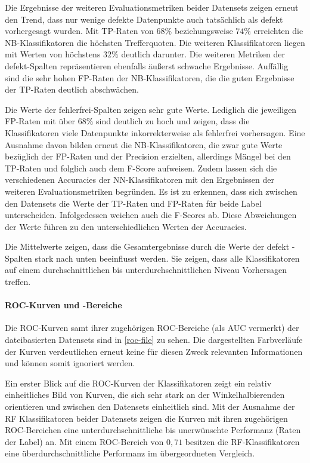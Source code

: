 Die Ergebnisse der weiteren Evaluationsmetriken beider Datensets zeigen erneut den Trend, dass nur wenige defekte Datenpunkte auch tatsächlich als defekt vorhergesagt wurden. Mit TP-Raten von $68\%$ beziehungsweise $74\%$ erreichten die NB-Klassifikatoren die höchsten Trefferquoten. Die weiteren Klassifikatoren liegen mit Werten von höchstens $32\%$ deutlich darunter. Die weiteren Metriken der \glqq defekt\grqq -Spalten repräsentieren ebenfalls äußerst schwache Ergebnisse. Auffällig sind die sehr hohen FP-Raten der NB-Klassifikatoren, die die guten Ergebnisse der TP-Raten deutlich abschwächen.

Die Werte der \glqq fehlerfrei\grqq -Spalten zeigen sehr gute Werte. Lediglich die jeweiligen FP-Raten mit über $68\%$ sind deutlich zu hoch und zeigen, dass die Klassifikatoren viele Datenpunkte inkorrekterweise als \glqq fehlerfrei\grqq{} vorhersagen. Eine Ausnahme davon bilden erneut die NB-Klassifikatoren, die zwar gute Werte bezüglich der FP-Raten und der Precision erzielten, allerdings Mängel bei den TP-Raten und folglich auch dem F-Score aufweisen. Zudem lassen sich die verschiedenen Accuracies der NN-Klassifikatoren mit den Ergebnissen der weiteren Evaluationsmetriken begründen. Es ist zu erkennen, dass sich zwischen den Datensets die Werte der TP-Raten und FP-Raten für beide Label unterscheiden. Infolgedessen weichen auch die F-Scores ab. Diese Abweichungen der Werte führen zu den unterschiedlichen Werten der Accuracies.

Die Mittelwerte zeigen, dass die Gesamtergebnisse durch die Werte der \glqq defekt\grqq{} -Spalten stark nach unten beeinflusst werden. Sie zeigen, dass alle Klassifikatoren auf einem durchschnittlichen bis unterdurchschnittlichen Niveau Vorhersagen treffen.

\paragraph{ROC-Kurven und -Bereiche}

Die ROC-Kurven samt ihrer zugehörigen ROC-Bereiche (als \glqq AUC\grqq{} vermerkt) der dateibasierten Datensets sind in \autoref{roc-file} zu sehen. Die dargestellten Farbverläufe der Kurven verdeutlichen erneut keine für diesen Zweck relevanten Informationen und können somit ignoriert werden.

Ein erster Blick auf die ROC-Kurven der Klassifikatoren zeigt ein relativ einheitliches Bild von Kurven, die sich sehr stark an der Winkelhalbierenden orientieren und zwischen den Datensets einheitlich sind. Mit der Ausnahme der RF Klassifikatoren beider Datensets zeigen die Kurven mit ihren zugehörigen ROC-Bereichen eine unterdurchschnittliche bis unerwünschte Performanz (\glqq Raten\grqq{} der Label) an. Mit einem ROC-Bereich von $0,71$ besitzen die RF-Klassifikatoren eine überdurchschnittliche Performanz im übergeordneten Vergleich.

